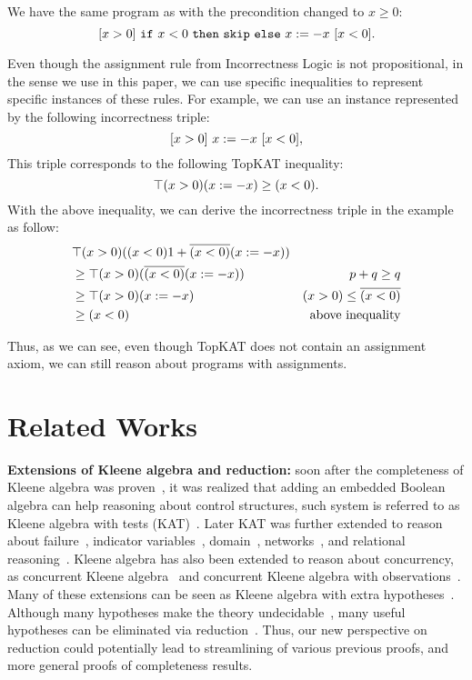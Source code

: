 \begin{example}[Assignment]
    We have the same program as 
    with the precondition changed to \(x \geq 0\):
    \[[x > 0]~\mathtt{if}~x < 0~\mathtt{then}~\mathtt{skip}~\mathtt{else}~x:= -x~[x < 0].\]

    Even though the assignment rule from Incorrectness Logic is not propositional, 
    in the sense we use in this paper,  
    we can use specific inequalities to represent specific instances of these rules. 
    For example, we can use an instance represented by the following incorrectness triple:
\[[x > 0]~x:= -x~[x < 0],\]
This triple corresponds to the following TopKAT inequality:
\[\top (x > 0) (x:= -x) \geq (x < 0).\]
With the above inequality, we can derive the incorrectness triple in the example as follow:
\begin{align*}
    & \top (x > 0) ((x < 0) 1 + \overline{(x < 0)} (x:= -x)) \\
    & \geq \top (x > 0) (\overline{(x < 0)} (x:= -x)) 
        & p + q \geq q\\
    & \geq \top (x > 0) (x:= -x) 
        & (x > 0) \leq \overline{(x < 0)}\\
    & \geq (x < 0) 
        & \text{above inequality}
\end{align*}
\end{example}

Thus, as we can see, even though TopKAT does not contain an assignment axiom,
we can still reason about programs with assignments.

\section{Related Works}

\textbf{Extensions of Kleene algebra and reduction:}
soon after the completeness of Kleene algebra was proven~\cite{Kozen_1994},
it was realized that adding an embedded Boolean algebra can help reasoning
about control structures, such system is referred to as
Kleene algebra with tests (KAT)~\cite{Kozen_Smith_1997,Cohen_Kozen_Smith_1999}.
Later KAT was further extended to reason about failure~\cite{Mamouras_2017},
indicator variables~\cite{Grathwohl_Kozen_Mamouras_2014},
domain~\cite{Desharnais_Möller_Struth_2006}, networks~\cite{Anderson_Foster_Guha_Jeannin_Kozen_Schlesinger_Walker_2014},
and relational reasoning~\cite{Antonopoulos_Koskinen_Le_Nagasamudram_Naumann_Ngo_2022}.
Kleene algebra has also been extended to reason about 
concurrency, as concurrent Kleene algebra~\cite{Hoare_van_Staden_Möller_Struth_Zhu_2016, Kappé_Brunet_Silva_Zanasi_2018}
and concurrent Kleene algebra with observations~\cite{Kappé_Brunet_Silva_Wagemaker_Zanasi_2020}.
Many of these extensions can be seen as Kleene algebra with extra hypotheses~\cite{Cohen_1995,Doumane_Kuperberg_Pous_Pradic_2019}.
Although many hypotheses make the theory undecidable~\cite{Kozen_1996,Kozen_2002,Doumane_Kuperberg_Pous_Pradic_2019},
many useful hypotheses can be eliminated via reduction~\cite{Pous_Rot_Wagemaker_2021}.
Thus, our new perspective on reduction could potentially lead to streamlining of various previous proofs, 
and more general proofs of completeness results.

